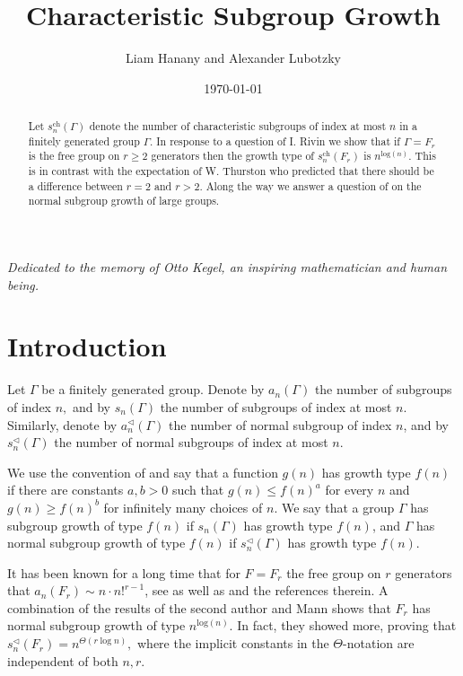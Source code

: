 \documentclass[letterpaper]{amsart}
\title{Characteristic Subgroup Growth}
\author{Liam Hanany and Alexander Lubotzky}
\date{\today}
\begin{document}
\begin{abstract}
Let $s_n^\mathrm{ch}(\Gamma)$ denote the number of characteristic subgroups of index at most $n$ in a finitely generated group $\Gamma$. In response to a question of I. Rivin we show that if $\Gamma = F_r$ is the free group on $r \geq 2$ generators then the growth type of $s_n^{\mathrm{ch}}(F_r)$ is $n^{\mathrm{log}(n)}$. This is in contrast with the expectation of W. Thurston who predicted that there should be a difference between $r = 2$ and $r > 2$. Along the way we answer a question of \cite{barnea2020large} on the normal subgroup growth of large groups.
\end{abstract}

\maketitle
\begin{center}
\textit{Dedicated to the memory of Otto Kegel, an inspiring mathematician and human being.}
\end{center}

\section{Introduction}
Let $\Gamma$ be a finitely generated group. Denote by $a_n(\Gamma)$ the number of subgroups of index $n,$ and by $s_n(\Gamma)$ the number of subgroups of index at most $n$. Similarly, denote by $a_n^\lhd(\Gamma)$ the number of normal subgroup of index $n$, and by $s_n^\lhd(\Gamma)$ the number of normal subgroups of index at most $n$.

We use the convention of \cite[Section 0.1]{lubotzky2012subgroup} and say that a function $g(n)$ has growth type $f(n)$ if there are constants $a,b > 0$ such that $g(n) \leq f(n)^a$ for every $n$ and $g(n) \geq f(n)^b$ for infinitely many choices of $n$. We say that a group $\Gamma$ has subgroup growth of type $f(n)$ if $s_n(\Gamma)$ has growth type $f(n)$, and $\Gamma$ has normal subgroup growth of type $f(n)$ if $s_n^\lhd(\Gamma)$ has growth type $f(n)$.

It has been known for a long time that for $F = F_r$ the free group on $r$ generators that $a_n(F_r) \sim n \cdot n!^{r-1}$, see \cite{hall1949subgroups} as well as \cite[Chapter 2]{lubotzky2012subgroup} and the references therein.
A combination of the results of the second author \cite{lubotzky2001enumerating} and Mann \cite{mann1998enumerating} shows that $F_r$ has normal subgroup growth of type $n^{\mathrm{log}(n)}$. In fact, they showed more, proving that $s_n^\lhd(F_r) = n^{\Theta(r\log n)},$ where the implicit constants in the $\Theta$-notation are independent of both $n, r.$
\end{document}
